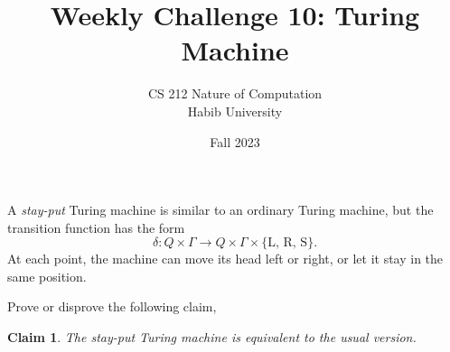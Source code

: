 \documentclass[a4paper]{exam}
\title{Weekly Challenge 10: Turing Machine}
\author{CS 212 Nature of Computation\\Habib University}
\date{Fall 2023}
\theoremstyle{theorem}
\theoremstyle{claim}
\newtheorem{claim}{Claim}
\begin{document}
\maketitle

\begin{questions}


  A \textit{stay-put} Turing machine is similar to an ordinary Turing machine, but the transition function has the form
  \[
    \delta: Q\times \Gamma \to Q\times \Gamma \times \{\text{L, R, S} \}.
   \]
   At each point, the machine can move its head left or right, or let it stay in the same position.

   Prove or disprove the following claim,

   \begin{claim}
     The stay-put Turing machine is equivalent to the usual version.
   \end{claim}
   
  
\end{questions}
\end{document}
